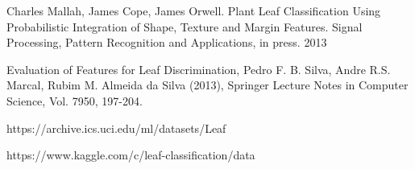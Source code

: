 \documentclass{article}
\begin{document}
\begin{thebibliography}{9}
Charles Mallah, James Cope, James Orwell. Plant Leaf Classification Using Probabilistic Integration of Shape, Texture and Margin Features. Signal Processing, Pattern Recognition and Applications, in press. 2013

Evaluation of Features for Leaf Discrimination, Pedro F. B. Silva, Andre R.S. Marcal, Rubim M. Almeida da Silva (2013), Springer Lecture Notes in Computer Science, Vol. 7950, 197-204.

https://archive.ics.uci.edu/ml/datasets/Leaf

https://www.kaggle.com/c/leaf-classification/data

\end{thebibliography}
\end{document}
